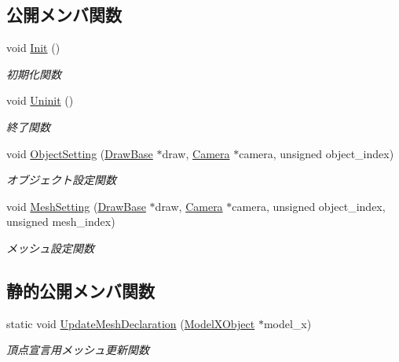\subsection*{公開メンバ関数}
\begin{DoxyCompactItemize}
\item 
void \mbox{\hyperlink{class_vertex_shader_bump_mapping_a6c0f59d1f29fd883943a66bfe61b6b03}{Init}} ()
\begin{DoxyCompactList}\small\item\em 初期化関数 \end{DoxyCompactList}\item 
void \mbox{\hyperlink{class_vertex_shader_bump_mapping_abed4e0aa9655fa7a7a21e03d00e7c0e5}{Uninit}} ()
\begin{DoxyCompactList}\small\item\em 終了関数 \end{DoxyCompactList}\item 
void \mbox{\hyperlink{class_vertex_shader_bump_mapping_a29aa8761a52dbd79b7cd3063027e67db}{Object\+Setting}} (\mbox{\hyperlink{class_draw_base}{Draw\+Base}} $\ast$draw, \mbox{\hyperlink{class_camera}{Camera}} $\ast$camera, unsigned object\+\_\+index)
\begin{DoxyCompactList}\small\item\em オブジェクト設定関数 \end{DoxyCompactList}\item 
void \mbox{\hyperlink{class_vertex_shader_bump_mapping_aea3347e35f823d5272b4adcd2ca9724a}{Mesh\+Setting}} (\mbox{\hyperlink{class_draw_base}{Draw\+Base}} $\ast$draw, \mbox{\hyperlink{class_camera}{Camera}} $\ast$camera, unsigned object\+\_\+index, unsigned mesh\+\_\+index)
\begin{DoxyCompactList}\small\item\em メッシュ設定関数 \end{DoxyCompactList}\end{DoxyCompactItemize}
\subsection*{静的公開メンバ関数}
\begin{DoxyCompactItemize}
\item 
static void \mbox{\hyperlink{class_vertex_shader_bump_mapping_a659d50e57533b9cd0204fc169985f1e0}{Update\+Mesh\+Declaration}} (\mbox{\hyperlink{class_model_x_object}{Model\+X\+Object}} $\ast$model\+\_\+x)
\begin{DoxyCompactList}\small\item\em 頂点宣言用メッシュ更新関数 \end{DoxyCompactList}\end{DoxyCompactItemize}
